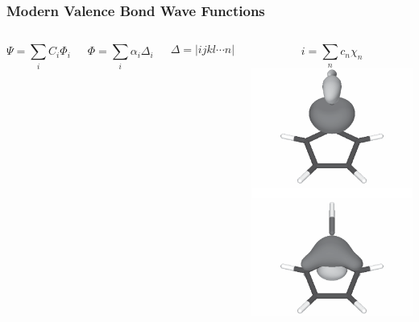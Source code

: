 \documentclass[]{beamer}
\begin{document}
\begin{frame}
  \frametitle{Modern Valence Bond Wave Functions}
  \begin{columns}[c]
  \column{2in}
    \begin{equation*}
      \Psi = \sum_{i} C_i \Phi_i
    \end{equation*}

    \begin{equation*}
      \Phi = \sum_{i} \alpha_i \Delta_i
    \end{equation*}

    \begin{equation*}
      \Delta = |ijkl \cdots n|
    \end{equation*}

    \begin{equation*}
      i = \sum_{n} c_n \chi_n
    \end{equation*}
  \column{2in}
    \includegraphics[scale=0.5]{figures/sigma_sih.eps}
  \end{columns}
\end{frame}
\end{document}
